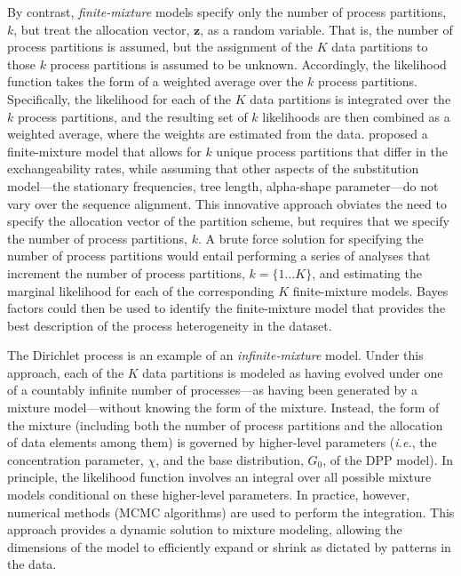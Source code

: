 \documentclass[11pt]{article}
\begin{document}
By contrast, \emph{finite-mixture} models specify only the number of process partitions, $k$, but treat the allocation vector, ${\mathbf z}$,  as a random variable.
That is, the number of process partitions is assumed, but the assignment of the $K$ data partitions to those $k$ process partitions is assumed to be unknown. 
Accordingly, the likelihood function takes the form of a weighted average over the $k$ process partitions.
Specifically, the likelihood for each of the $K$ data partitions is integrated over the $k$ process partitions, and the resulting set of $k$ likelihoods are then combined as a weighted average, where the weights are estimated from the data.
\citet{pagel04} proposed a finite-mixture model that allows for $k$ unique process partitions that differ in the exchangeability rates, while assuming that other aspects of the substitution model---the stationary frequencies, tree length, alpha-shape parameter---do not vary over the sequence alignment.
This innovative approach obviates the need to specify the allocation vector of the partition scheme, but requires that we specify the number of process partitions, $k$.
A brute force solution for specifying the number of process partitions would entail performing a series of analyses that increment the number of process partitions, $k=\{1\dots K\}$, and estimating the marginal likelihood for each of the corresponding $K$ finite-mixture models.
Bayes factors could then be used to identify the finite-mixture model that provides the best description of the process heterogeneity in the dataset.   

The Dirichlet process is an example of an \emph{infinite-mixture} model.
Under this approach, each of the $K$ data partitions is modeled as having evolved under one of a countably infinite number of processes---as having been generated by a mixture model---without knowing the form of the mixture.
Instead, the form of the mixture (including both the number of process partitions and the allocation of data elements among them) is governed by higher-level parameters  ({\it i.e.}, the concentration parameter, $\chi$, and the base distribution, $G_0$, of the DPP model).
In principle, the likelihood function involves an integral over all possible mixture models conditional on these higher-level parameters.
In practice, however, numerical methods (MCMC algorithms) are used to perform the integration.
This approach provides a dynamic solution to mixture modeling, allowing the dimensions of the model to efficiently expand or shrink as dictated by patterns in the data.
\end{document}
